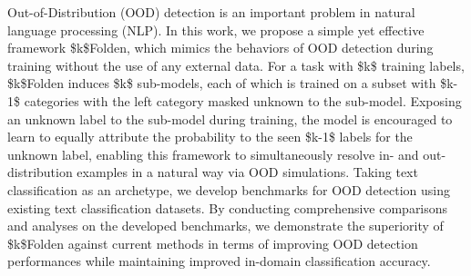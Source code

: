 Out-of-Distribution (OOD) detection is an important problem in natural language processing (NLP). In this work, we propose a simple yet effective framework \$k\$Folden, which mimics the behaviors of OOD detection during training without the use of any external data. For a task with \$k\$ training labels, \$k\$Folden induces \$k\$ sub-models, each of which is trained on a subset with \$k-1\$ categories with the left category masked unknown to the sub-model. Exposing an unknown label to the sub-model during training, the model is encouraged to learn to equally attribute the probability  to the seen \$k-1\$ labels for the unknown label, enabling  this framework to simultaneously resolve in- and out-distribution examples in a natural way via OOD simulations. Taking text classification as an archetype, we develop benchmarks for OOD detection using existing text classification datasets. By conducting comprehensive comparisons and analyses on the developed benchmarks, we demonstrate the superiority of \$k\$Folden against current methods in terms of improving OOD detection performances while maintaining improved in-domain classification accuracy.
